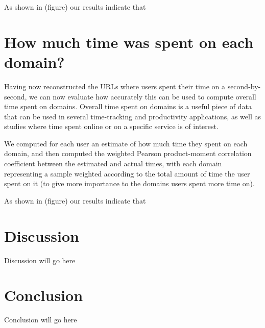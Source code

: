 \documentclass{sigchi}
\begin{document}
As shown in (figure) our results indicate that 

\section{How much time was spent on each domain?}

Having now reconstructed the URLs where users spent their time on a second-by-second, we can now evaluate how accurately this can be used to compute overall time spent on domains. Overall time spent on domains is a useful piece of data that can be used in several time-tracking and productivity applications, as well as studies where time spent online or on a specific service is of interest.

We computed for each user an estimate of how much time they spent on each domain, and then computed the weighted Pearson product-moment correlation coefficient between the estimated and actual times, with each domain representing a sample weighted according to the total amount of time the user spent on it (to give more importance to the domains users spent more time on).

As shown in (figure) our results indicate that 

\section{Discussion}

Discussion will go here

\section{Conclusion}

Conclusion will go here

%
%
%
%
%
\balance




\end{document}
